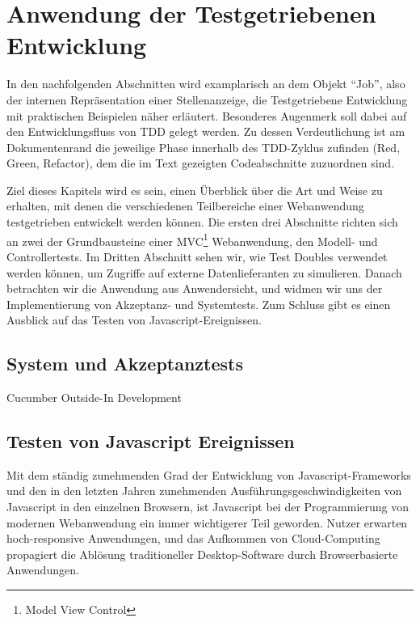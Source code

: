 \section{Anwendung der Testgetriebenen Entwicklung}
\label{sec:awtdd}

In den nachfolgenden Abschnitten wird examplarisch an dem Objekt "`Job"', also der internen Repräsentation einer Stellenanzeige, die Testgetriebene Entwicklung mit praktischen Beispielen näher erläutert.
Besonderes Augenmerk soll dabei auf den Entwicklungsfluss von TDD gelegt werden. Zu dessen Verdeutlichung ist am Dokumentenrand die jeweilige Phase innerhalb des TDD-Zyklus zufinden (Red, Green, Refactor), dem die im Text gezeigten Codeabschnitte zuzuordnen sind.

Ziel dieses Kapitels wird es sein, einen Überblick über die Art und Weise zu erhalten, mit denen die verschiedenen Teilbereiche einer Webanwendung testgetrieben entwickelt werden können.
Die ersten drei Abschnitte richten sich an zwei der Grundbausteine einer MVC\footnote{Model View Control} %
Webanwendung, den Modell- und Controllertests. Im Dritten Abschnitt sehen wir, wie Test Doubles verwendet werden können, um Zugriffe auf externe Datenlieferanten zu simulieren. Danach betrachten wir die Anwendung aus Anwendersicht, und widmen wir uns der Implementierung von Akzeptanz- und Systemtests. %
Zum Schluss gibt es einen Ausblick auf das Testen von Javascript-Ereignissen.









\subsection{System und Akzeptanztests}
\label{sec:system}
Cucumber Outside-In Development


\subsection{Testen von Javascript Ereignissen}

Mit dem ständig zunehmenden Grad der Entwicklung von Javascript-Frameworks und den in den letzten Jahren zunehmenden Ausführungsgeschwindigkeiten von Javascript in den einzelnen Browsern, ist Javascript bei der Programmierung von modernen Webanwendung ein immer wichtigerer Teil geworden. Nutzer erwarten hoch-responsive Anwendungen, und das Aufkommen von Cloud-Computing propagiert die Ablösung traditioneller Desktop-Software durch Browserbasierte Anwendungen.




